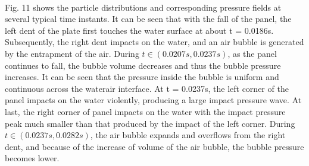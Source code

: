 \documentclass[UTF8]{ctexart}
\begin{document}
\paragraph{\quad}Fig. 11 shows the particle distributions and corresponding pressure 
                fields at several typical time instants. It can be seen that with the 
                fall of the panel, the left dent of the plate first touches the water 
                surface at about t = 0.0186s. Subsequently, the right dent impacts on 
                the water, and an air bubble is generated by the entrapment of the air. 
                During $t \in (0.0207s, 0.0237s)$, as the panel continues to fall, the bubble 
                volume decreases and thus the bubble pressure increases. It can be seen 
                that the pressure inside the bubble is uniform and continuous across the 
                waterair interface. At t = 0.0237s, the left corner of the panel impacts 
                on the water violently, producing a large impact pressure wave. At last, 
                the right corner of panel impacts on the water with the impact pressure 
                peak much smaller than that produced by the impact of the left corner. 
                During $t \in (0.0237s, 0.0282s)$, the air bubble expands and overflows from 
                the right dent, and because of the increase of volume of the air bubble, 
                the bubble pressure becomes lower.
\end{document}
